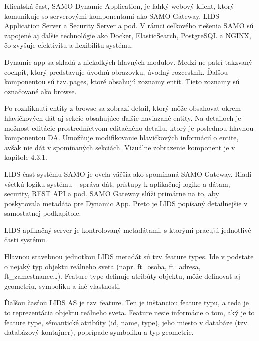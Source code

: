


Klientská čast, SAMO Dynamic Application, je ľahký webový klient, ktorý komunikuje so serverovými komponentami ako SAMO Gateway, LIDS Application Server a Security Server a pod. V rámci celkového riešenia SAMO sú zapojené aj ďalšie technológie ako Docker, ElasticSearch, PostgreSQL a NGINX, čo zvyšuje efektivitu a flexibilitu systému.

Dynamic app sa skladá z niekoľkých hlavných modulov. Medzi ne patrí takzvaný cockpit, ktorý predstavuje úvodnú obrazovku, úvodný rozcestník. Ďalšou komponentou sú tzv.\,pages, ktoré obsahujú zoznamy entít. Tieto zoznamy sú označované ako browse. 

Po rozkliknutí entity z browse sa zobrazí detail, ktorý môže obsahovať okrem hlavičkových dát aj sekcie obsahujúce ďalšie naviazané entity. Na detailoch je možnosť editácie prostredníctvom editačného detailu,  ktorý je poslednou hlavnou komponentou DA. Umožňuje modifikovanie hlavičkových informácií o entite, avšak nie dát v spomínaných sekciách. Vizuálne zobrazenie komponent je v kapitole 4.3.1.



LIDS časť systému SAMO je oveľa väčšia ako spomínaná SAMO Gateway. Riadi všetkú logiku systému -- správa dát, prístupy k aplikačnej logike a dátam, security, REST API a pod. SAMO Gateway slúži primárne na to, aby poskytovala metadáta pre Dynamic App. Preto je LIDS popísaný detailnejšie v samostatnej podkapitole.

LIDS aplikačný server je kontrolovaný metadátami, s ktorými pracujú jednotlivé časti systému. 

Hlavnou stavebnou jednotkou LIDS metadát sú tzv.\,feature types. Ide v podstate o nejaký typ objektu reálneho sveta (napr. ft\_osoba, ft\_adresa, ft\_zamestnanec\dots). Feature type definuje atribúty objektu, môže definovať aj geometriu, symboliku a iné vlastnosti.

Ďalšou časťou LIDS AS je tzv\, feature. Ten je inštanciou feature typu, a teda je to reprezentácia objektu reálneho sveta. Feature nesie informácie o tom, aký je to feature type, sémantické atribúty (id, name, type), jeho miesto v databáze (tzv.\,databázový kontajner), poprípade symboliku a typ geometrie.

